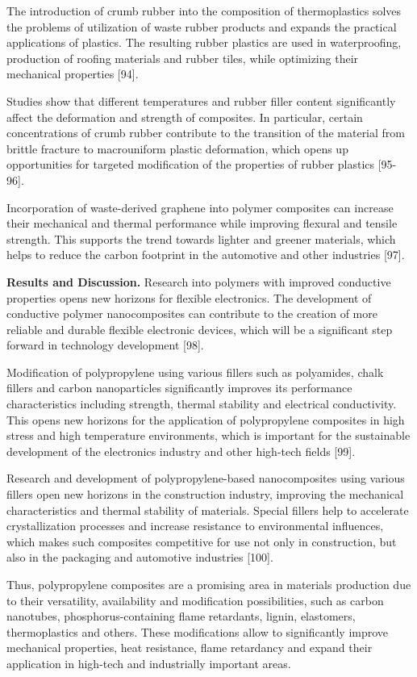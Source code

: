 The introduction of crumb rubber into the composition of thermoplastics
solves the problems of utilization of waste rubber products and expands
the practical applications of plastics. The resulting rubber plastics
are used in waterproofing, production of roofing materials and rubber
tiles, while optimizing their mechanical properties {[}94{]}.

Studies show that different temperatures and rubber filler content
significantly affect the deformation and strength of composites. In
particular, certain concentrations of crumb rubber contribute to the
transition of the material from brittle fracture to macrouniform plastic
deformation, which opens up opportunities for targeted modification of
the properties of rubber plastics {[}95-96{]}.

Incorporation of waste-derived graphene into polymer composites can
increase their mechanical and thermal performance while improving
flexural and tensile strength. This supports the trend towards lighter
and greener materials, which helps to reduce the carbon footprint in the
automotive and other industries {[}97{]}.

{\bfseries Results and Discussion.} Research into polymers with improved
conductive properties opens new horizons for flexible electronics. The
development of conductive polymer nanocomposites can contribute to the
creation of more reliable and durable flexible electronic devices, which
will be a significant step forward in technology development {[}98{]}.

Modification of polypropylene using various fillers such as polyamides,
chalk fillers and carbon nanoparticles significantly improves its
performance characteristics including strength, thermal stability and
electrical conductivity. This opens new horizons for the application of
polypropylene composites in high stress and high temperature
environments, which is important for the sustainable development of the
electronics industry and other high-tech fields {[}99{]}.

Research and development of polypropylene-based nanocomposites using
various fillers open new horizons in the construction industry,
improving the mechanical characteristics and thermal stability of
materials. Special fillers help to accelerate crystallization processes
and increase resistance to environmental influences, which makes such
composites competitive for use not only in construction, but also in the
packaging and automotive industries {[}100{]}.

Thus, polypropylene composites are a promising area in materials
production due to their versatility, availability and modification
possibilities, such as carbon nanotubes, phosphorus-containing flame
retardants, lignin, elastomers, thermoplastics and others. These
modifications allow to significantly improve mechanical properties, heat
resistance, flame retardancy and expand their application in high-tech
and industrially important areas.


